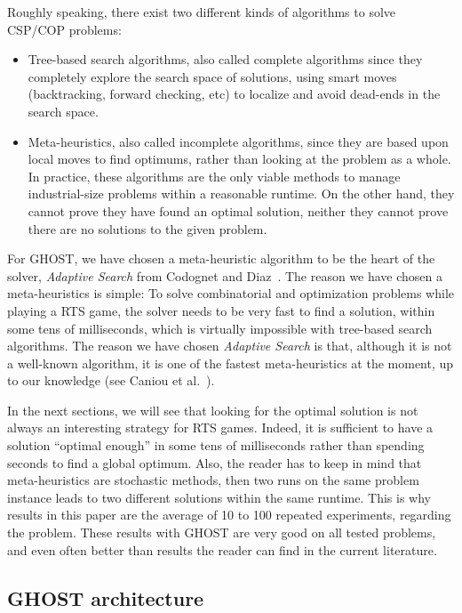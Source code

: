 \documentclass{article}
\newcommand{\csp}{\textsc{CSP}\xspace}
\newcommand{\cop}{\textsc{COP}\xspace}
\newcommand{\ghost}{\textsc{GHOST}\xspace}
\begin{document}
Roughly speaking,  there exist  two different  kinds of  algorithms to
solve \csp/\cop problems:
\begin{itemize}
\item Tree-based  search algorithms,  also called  complete algorithms
  since they completely  explore the search space  of solutions, using
  smart moves  (backtracking, forward  checking, etc) to  localize and
  avoid dead-ends in the search space.
\item Meta-heuristics,  also called incomplete algorithms,  since they
  are based upon local moves to  find optimums, rather than looking at
  the problem as  a whole. In practice, these algorithms  are the only
  viable  methods   to  manage   industrial-size  problems   within  a
  reasonable runtime. On  the other hand, they cannot  prove they have
  found an  optimal solution, neither  they cannot prove there  are no
  solutions to the given problem.
\end{itemize}

For \ghost, we have chosen a  meta-heuristic algorithm to be the heart
of   the   solver,   {\it   Adaptive   Search}   from   Codognet   and
Diaz~\cite{Codognet01}. The reason we have chosen a meta-heuristics is
simple: To solve combinatorial and optimization problems while playing
a RTS  game, the  solver needs  to be  very fast  to find  a solution,
within some tens  of milliseconds, which is  virtually impossible with
tree-based search algorithms. The reason  we have chosen {\it Adaptive
  Search} is  that, although it is  not a well-known algorithm,  it is
one of the fastest meta-heuristics at  the moment, up to our knowledge
(see Caniou et al.~\cite{Caniou14}).

In  the next  sections,  we  will see  that  looking  for the  optimal
solution is not always an  interesting strategy for RTS games. Indeed,
it is sufficient to have a solution ``optimal enough'' in some tens of
milliseconds   rather  than   spending  seconds   to  find   a  global
optimum. Also, the reader has to keep in mind that meta-heuristics are
stochastic methods, then  two runs on the same  problem instance leads
to  two different  solutions within  the  same runtime.   This is  why
results  in  this  paper  are  the  average  of  10  to  100  repeated
experiments,  regarding the  problem.  These  results with  \ghost are
very good on  all tested problems, and even often  better than results
the reader can find in the current literature.

\subsection{\ghost architecture}
\end{document}
